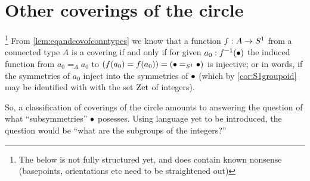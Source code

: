 


\section{Other coverings of the circle}
\label{sec:covS1}

\footnote{The below is not fully structured yet, and does contain known nonsense (basepoints, orientations etc need to be straightened out)}
From \cref{lem:eqandcovofconntypes} we know that a function $f:A\to S^1$ from a connected type $A$ is a covering if and only if for given $a_0:f^{-1}(\bullet)$ the induced function from $a_0=_Aa_0$ to $(f(a_0)=f(a_0))=(\bullet=_{S^1}\bullet)$ is injective; or in words, if the symmetries of $a_0$ inject into the symmetries of $\bullet$ (which by \cref{cor:S1groupoid} may be identified with with the set $\mathrm{Zet}$ of integers).

So, a classification of coverings of the circle amounts to answering the question of what ``subsymmetries'' $\bullet$ posesses.  Using language yet to be introduced, the question would be ``what are the subgroups of the integers?''

